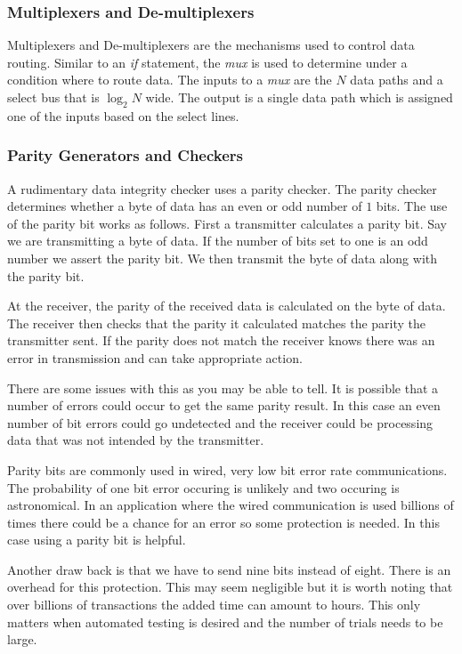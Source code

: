 \subsubsection{Multiplexers and De-multiplexers}
	
Multiplexers and De-multiplexers are the mechanisms used to control data routing. Similar to an \emph{if} statement, the \emph{mux} is used to determine under a condition where to route data. The inputs to a \emph{mux} are the $N$ data paths and a select bus that is $\log_{2}N$ wide. The output is a single data path which is assigned one of the inputs based on the select lines. 

\subsubsection{Parity Generators and Checkers}
	
A rudimentary data integrity checker uses a parity checker. The parity checker determines whether a byte of data has an even or odd number of $1$ bits. The use of the parity bit works as follows. First a transmitter calculates a parity bit. Say we are transmitting a byte of data. If the number of bits set to one is an odd number we assert the parity bit. We then transmit the byte of data along with the parity bit. 

At the receiver, the parity of the received data is calculated on the byte of data. The receiver then checks that the parity it calculated matches the parity the transmitter sent. If the parity does not match the receiver knows there was an error in transmission and can take appropriate action.

There are some issues with this as you may be able to tell. It is possible that a number of errors could occur to get the same parity result. In this case an even number of bit errors could go undetected and the receiver could be processing data that was not intended by the transmitter. 

Parity bits are commonly used in wired, very low bit error rate communications. The probability of one bit error occuring is unlikely and two occuring is astronomical. In an application where the wired communication is used billions of times there could be a chance for an error so some protection is needed. In this case using a parity bit is helpful. 

Another draw back is that we have to send nine bits instead of eight. There is an overhead for this protection. This may seem negligible but it is worth noting that over billions of transactions the added time can amount to hours. This only matters when automated testing is desired and the number of trials needs to be large. 

